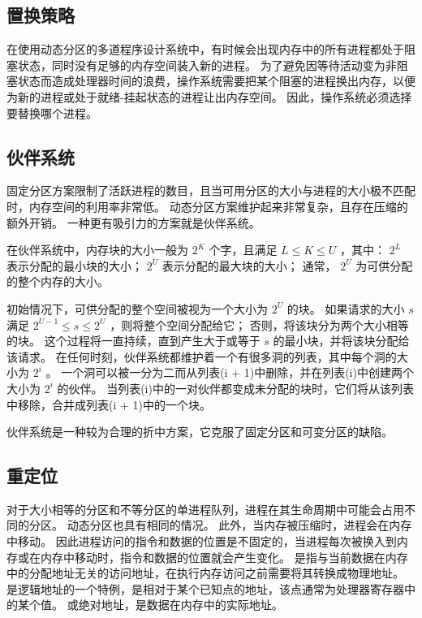 {    \subsection{置换策略}
    {
        在使用动态分区的多道程序设计系统中，有时候会出现内存中的所有进程都处于阻塞状态，同时没有足够的内存空间装入新的进程。
        为了避免因等待活动变为非阻塞状态而造成处理器时间的浪费，操作系统需要把某个阻塞的进程换出内存，以便为新的进程或处于就绪-挂起状态的进程让出内存空间。
        因此，操作系统必须选择要替换哪个进程。
    }

    \subsection{伙伴系统}
    {
        固定分区方案限制了活跃进程的数目，且当可用分区的大小与进程的大小极不匹配时，内存空间的利用率非常低。
        动态分区方案维护起来非常复杂，且存在压缩的额外开销。
        一种更有吸引力的方案就是伙伴系统。

        在伙伴系统中，内存块的大小一般为 $2^K$ 个字，且满足 $L \leq K \leq U$ ，其中：
        $2^L$ 表示分配的最小块的大小；
        $2^U$ 表示分配的最大块的大小；
        通常， $2^U$ 为可供分配的整个内存的大小。

        初始情况下，可供分配的整个空间被视为一个大小为 $2^U$ 的块。
        如果请求的大小 $s$ 满足 $2^{U - 1} \leq s \leq 2^U$ ，则将整个空间分配给它；
        否则，将该块分为两个大小相等的块。
        这个过程将一直持续，直到产生大于或等于 $s$ 的最小块，并将该块分配给该请求。
        在任何时刻，伙伴系统都维护着一个有很多洞的列表，其中每个洞的大小为 $2^i$ 。
        一个洞可以被一分为二而从列表(i + 1)中删除，并在列表(i)中创建两个大小为 $2^i$ 的伙伴。
        当列表(i)中的一对伙伴都变成未分配的块时，它们将从该列表中移除，合并成列表(i + 1)中的一个块。

        伙伴系统是一种较为合理的折中方案，它克服了固定分区和可变分区的缺陷。
    }

    \subsection{重定位}
    {
        对于大小相等的分区和不等分区的单进程队列，进程在其生命周期中可能会占用不同的分区。
        动态分区也具有相同的情况。
        此外，当内存被压缩时，进程会在内存中移动。
        因此进程访问的指令和数据的位置是不固定的，当进程每次被换入到内存或在内存中移动时，指令和数据的位置就会产生变化。
        是指与当前数据在内存中的分配地址无关的访问地址，在执行内存访问之前需要将其转换成物理地址。
        是逻辑地址的一个特例，是相对于某个已知点的地址，该点通常为处理器寄存器中的某个值。
        或绝对地址，是数据在内存中的实际地址。

}}
